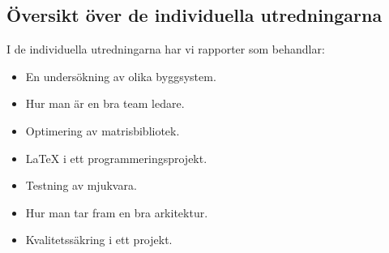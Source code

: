 \subsection{Översikt över de individuella utredningarna}
I de individuella utredningarna har vi rapporter som behandlar: 
\begin{itemize}
	\item En undersökning av olika byggsystem.
	\item Hur man är en bra team ledare.
	\item Optimering av matrisbibliotek. 
	\item {\LaTeX} i ett programmeringsprojekt.
	\item Testning av mjukvara. 
	\item Hur man tar fram en bra arkitektur. 
	\item Kvalitetssäkring i ett projekt.  
\end{itemize}


